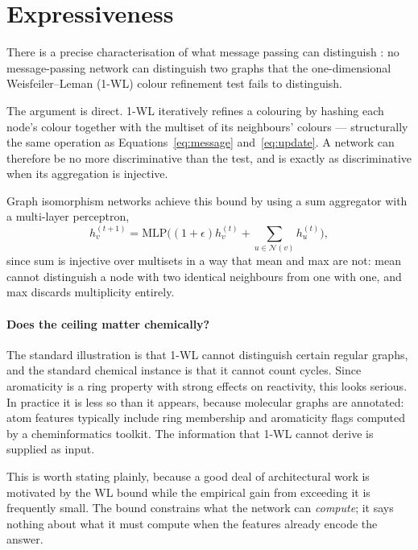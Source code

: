 \documentclass[11pt,a4paper]{article}
\begin{document}
\section{Expressiveness}
\label{sec:expressive}

There is a precise characterisation of what message passing can distinguish
\cite{xu2019, morris2019}: no message-passing network can distinguish two
graphs that the one-dimensional Weisfeiler--Leman (1-WL) colour refinement
test fails to distinguish.

The argument is direct. 1-WL iteratively refines a colouring by hashing each
node's colour together with the multiset of its neighbours' colours ---
structurally the same operation as Equations~\ref{eq:message}
and~\ref{eq:update}. A network can therefore be no more discriminative than
the test, and is exactly as discriminative when its aggregation is injective.

Graph isomorphism networks \cite{xu2019} achieve this bound by using a sum
aggregator with a multi-layer perceptron,
\begin{equation}
  h_v^{(t+1)} = \mathrm{MLP}\Big( (1 + \epsilon) h_v^{(t)} +
                \sum_{u \in \mathcal{N}(v)} h_u^{(t)} \Big),
\end{equation}
since sum is injective over multisets in a way that mean and max are not: mean
cannot distinguish a node with two identical neighbours from one with one, and
max discards multiplicity entirely.

\paragraph{Does the ceiling matter chemically?}
The standard illustration is that 1-WL cannot distinguish certain regular
graphs, and the standard chemical instance is that it cannot count cycles.
Since aromaticity is a ring property with strong effects on reactivity, this
looks serious. In practice it is less so than it appears, because molecular
graphs are annotated: atom features typically include ring membership and
aromaticity flags computed by a cheminformatics toolkit. The information that
1-WL cannot derive is supplied as input.

This is worth stating plainly, because a good deal of architectural work is
motivated by the WL bound while the empirical gain from exceeding it is
frequently small. The bound constrains what the network can \emph{compute};
it says nothing about what it must compute when the features already encode
the answer.
\end{document}

